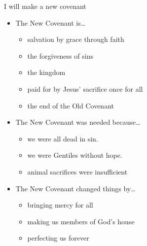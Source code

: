 \begin{frame}{I will make a new covenant}
	\begin{itemize}
		\item The New Covenant is\ldots
		\begin{itemize}
			\item salvation by grace through faith
			\item the forgiveness of sins
			\item the kingdom
			\item paid for by Jesus' sacrifice once for all
			\item the end of the Old Covenant
		\end{itemize}
		\item The New Covenant was needed because\ldots
		\begin{itemize}
			\item we were all dead in sin.
			\item we were Gentiles without hope.
			\item animal sacrifices were insufficient
		\end{itemize}
		\item The New Covenant changed things by\dots
		\begin{itemize}
			\item bringing mercy for all
			\item making us members of God's house
			\item perfecting us forever
		\end{itemize}
	\end{itemize}
	
\end{frame}

